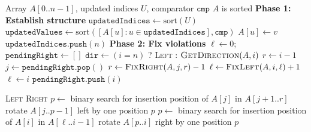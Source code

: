 \begin{algorithm}[!t]
\small
\caption{DeltaSort}
\label{alg:deltasort}
\begin{algorithmic}[1]
\Require Array $A[0..n-1]$, updated indices $U$, comparator $\texttt{cmp}$
\Ensure $A$ is sorted
\Statex
\State \textbf{Phase 1: Establish structure}
\State $\texttt{updatedIndices} \gets \text{sort}(U)$
\State $\texttt{updatedValues} \gets \text{sort}([A[u] : u \in \texttt{updatedIndices}], \texttt{cmp})$
\State $A[u] \gets v$
\EndFor
\State $\texttt{updatedIndices.push}(n)$ 
\Statex
\State \textbf{Phase 2: Fix violations}
\State $\ell \gets 0$; $\texttt{pendingRight} \gets []$
    \State $\texttt{dir} \gets (i = n)$ ? \textsc{Left} : $\Call{GetDirection}{A, i}$
        \State $r \gets i - 1$
            \State $j \gets \texttt{pendingRight.pop}()$
                \State $r \gets \Call{FixRight}{A, j, r} - 1$
            \EndIf
        \EndWhile
         
            \State $\ell \gets \Call{FixLeft}{A, i, \ell} + 1$
        \EndIf
    \Else
         
            \State $\ell \gets i$
        \EndIf
        \State $\texttt{pendingRight.push}(i)$ 
    \EndIf
\EndFor
\end{algorithmic}
\end{algorithm}

\begin{algorithm}[!t]
\small
\caption{Helper procedures}
\label{alg:helpers}
\begin{algorithmic}[1]
    \State \Return \textsc{Left}
  \Else
    \State \Return \textsc{Right}
  \EndIf
\EndFunction
\Statex
{}
  \State $p \gets$ binary search for insertion position of $A[j]$ in $A[j{+}1..r]$
  \State rotate $A[j..p{-}1]$ left by one position 
  \State \Return $p$
\EndFunction
\Statex
{}
  \State $p \gets$ binary search for insertion position of $A[i]$ in $A[\ell..i{-}1]$
  \State rotate $A[p..i]$ right by one position 
  \State \Return $p$
\EndFunction
\end{algorithmic}
\end{algorithm}